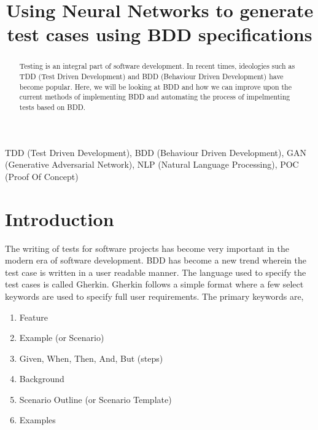 \documentclass[conference]{IEEEtran}
\begin{document}
\title{Using Neural Networks to generate test cases using BDD specifications}

\author{
}

\maketitle

\begin{abstract}
Testing is an integral part of software development. In recent times, ideologies such as TDD (Test Driven Development) and BDD (Behaviour Driven Development) have become popular. Here, we will be looking at BDD and how we can improve upon the current methods of implementing BDD and automating the process of impelmenting tests based on BDD. 
\end{abstract}

\begin{IEEEkeywords}
TDD (Test Driven Development), BDD (Behaviour Driven Development), GAN (Generative Adversarial Network), NLP (Natural Language Processing), POC (Proof Of Concept)
\end{IEEEkeywords}

\section{Introduction}
The writing of tests for software projects has become very important in the modern era of software development. BDD has become a new trend wherein the test case is written in a user readable manner. The language used to specify the test cases is called Gherkin. Gherkin follows a simple format where a few select keywords are used to specify full user requirements.\cite{a1} The primary keywords are,
\begin{enumerate}
	\item Feature
	\item Example (or Scenario)
	\item Given, When, Then, And, But (steps)
	\item Background
	\item Scenario Outline (or Scenario Template)
	\item Examples
\end{enumerate}
\end{document}
